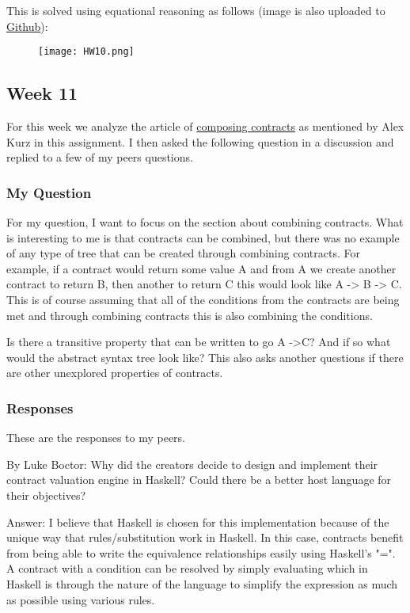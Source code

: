 \documentclass{article}
\theoremstyle{theorem}
\theoremstyle{definition}
\theoremstyle{remark}
\begin{document}
This is solved using equational reasoning as follows (image is also uploaded to \href{https://github.com/dapak2002/Pak-D-CPSC-354-Report/blob/main/src/HW10.png}{Github}):

\begin{figure}[htp]
    \centering
    \texttt{[image: HW10.png]}
\end{figure}

\subsection{Week 11}
For this week we analyze the article of \href{https://hackmd.io/@alexhkurz/rJ9O5tZSo}{composing contracts} as mentioned by Alex Kurz in this assignment. I then asked the following question in a discussion and replied to a few of my peers questions.

\subsubsection{My Question}
For my question, I want to focus on the section about combining contracts. What is interesting to me is that contracts can be combined, but there was no example of any type of tree that can be created through combining contracts. For example, if a contract would return some value A and from A we create another contract to return B, then another to return C this would look like A -> B -> C. This is of course assuming that all of the conditions from the contracts are being met and through combining contracts this is also combining the conditions.

Is there a transitive property that can be written to go A ->C? And if so what would the abstract syntax tree look like? This also asks another questions if there are other unexplored properties of contracts.

\subsubsection{Responses}
These are the responses to my peers.

\medskip
By Luke Boctor: Why did the creators decide to design and implement their contract valuation engine in Haskell? Could there be a better host language for their objectives?

\medskip
Answer: I believe that Haskell is chosen for this implementation because of the unique way that rules/substitution work in Haskell. In this case, contracts benefit from being able to write the equivalence relationships easily using Haskell's "=".  A contract with a condition can be resolved by simply evaluating which in Haskell is through the nature of the language to simplify the expression as much as possible using various rules. 
\end{document}
